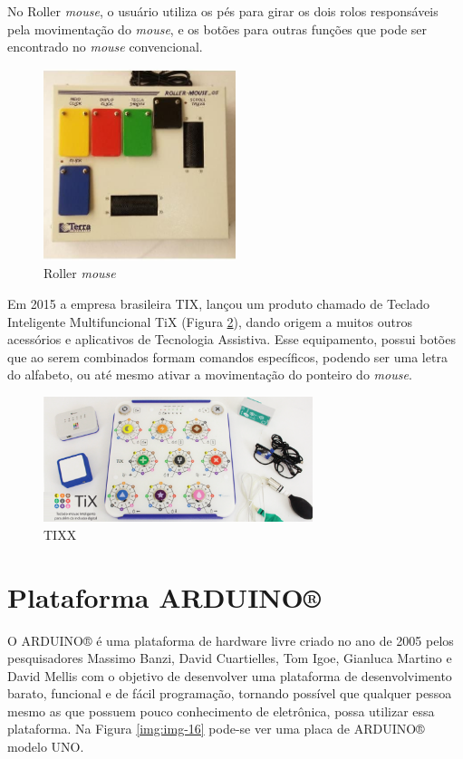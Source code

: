 \documentclass[
	12pt,			%
	openright,		%
	oneside,			%
	a4paper,			%
	chapter=TITLE,		%
	english,			%
	brazil,			%
	]{abntex2}
\begin{document}
No Roller \emph{mouse}, o usuário utiliza os pés para girar os dois rolos responsáveis pela movimentação do \emph{mouse}, e os botões para outras funções que pode ser encontrado no \emph{mouse} convencional.

\begin{figure}[H]
	\centering
		\includegraphics[width=0.5\textwidth]{./img/img-9.jpg}
		\caption{Roller \emph{mouse}}
		\label{img:img-9}
\end{figure}

Em 2015 a empresa brasileira TIX, lançou um produto chamado de Teclado Inteligente Multifuncional TiX (Figura \ref{img:img-14}), dando origem a muitos outros acessórios e aplicativos de Tecnologia Assistiva. Esse equipamento, possui botões que ao serem combinados formam comandos específicos, podendo ser uma letra do alfabeto, ou até mesmo ativar a movimentação do ponteiro do \emph{mouse}.

\begin{figure}[H]
	\centering
		\includegraphics[width=0.7\textwidth]{./img/img-14.png}
		\caption{TIXX}
		\label{img:img-14}
\end{figure}

\section{Plataforma ARDUINO®}

O ARDUINO® é uma plataforma de hardware livre criado no ano de 2005 pelos pesquisadores Massimo Banzi, David Cuartielles, Tom Igoe, Gianluca Martino e David Mellis com o objetivo de desenvolver uma plataforma de desenvolvimento barato, funcional e de fácil programação, tornando possível que qualquer pessoa mesmo as que possuem pouco conhecimento de eletrônica, possa utilizar essa plataforma. Na Figura \ref{img:img-16} pode-se ver uma placa de ARDUINO® modelo UNO.
\end{document}
